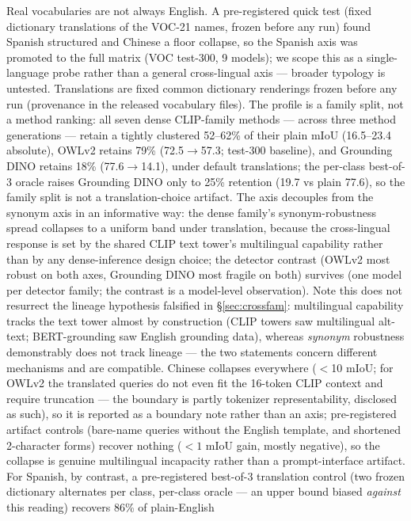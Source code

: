 \documentclass[11pt]{article}
\newcommand{\miou}{mIoU}
\begin{document}
Real vocabularies are not always English. A pre-registered quick test
(fixed dictionary translations of the VOC-21 names, frozen before any run)
found Spanish structured and Chinese a floor collapse, so the Spanish axis
was promoted to the full matrix (VOC test-300, 9 models); we scope this as
a single-language probe rather than a general cross-lingual axis ---
broader typology is untested. Translations are fixed common dictionary
renderings frozen before any run (provenance in the released vocabulary
files). The profile is a
family split, not a method ranking: all seven dense CLIP-family methods ---
across three method generations --- retain a tightly clustered 52--62\% of
their plain \miou{} (16.5--23.4 absolute), OWLv2 retains 79\%
(72.5$\to$57.3; test-300 baseline), and Grounding DINO retains 18\% (77.6$\to$14.1), under
default translations; the per-class best-of-3 oracle raises Grounding
DINO only to 25\% retention (19.7 vs plain 77.6), so the family split is
not a translation-choice artifact. The axis
decouples from the synonym axis in an informative way: the dense family's
synonym-robustness spread collapses to a uniform band under translation,
because the cross-lingual response is set by the shared CLIP text tower's
multilingual capability rather than by any dense-inference design choice;
the detector contrast (OWLv2 most robust on both axes, Grounding DINO most
fragile on both) survives (one model per detector family; the contrast is a
model-level observation). Note this does not resurrect the lineage
hypothesis falsified in \S\ref{sec:crossfam}: multilingual capability
tracks the text tower almost by construction (CLIP towers saw multilingual
alt-text; BERT-grounding saw English grounding data), whereas
\emph{synonym} robustness demonstrably does not track lineage --- the two
statements concern different mechanisms and are compatible. Chinese collapses everywhere ($<$10 \miou{};
for OWLv2 the translated queries do not even fit the 16-token CLIP context
and require truncation --- the boundary is partly tokenizer
representability, disclosed as such), so it is reported as a boundary
note rather than an axis; pre-registered artifact controls (bare-name
queries without the English template, and shortened 2-character forms)
recover nothing ($<1$ \miou{} gain, mostly negative), so the collapse is
genuine multilingual incapacity rather than a prompt-interface artifact.
For Spanish, by contrast, a pre-registered best-of-3 translation control
(two frozen dictionary alternates per class, per-class oracle --- an upper
bound biased \emph{against} this reading) recovers 86\% of plain-English
\end{document}
